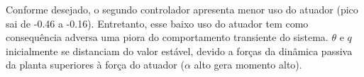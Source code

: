 \documentclass[13pt]{article}
\begin{document}
Conforme desejado, o segundo controlador apresenta menor uso do atuador
(pico sai de -0.46 a -0.16). Entretanto, esse baixo uso do atuador tem
como consequência adversa uma piora do comportamento transiente do
sistema. \(\theta\) e \(q\) inicialmente se distanciam do valor estável,
devido a forças da dinâmica passiva da planta superiores à força do
atuador (\(\alpha\) alto gera momento alto).

\begin{figure}[H]
    \centering


    
\end{figure}


\end{document}
